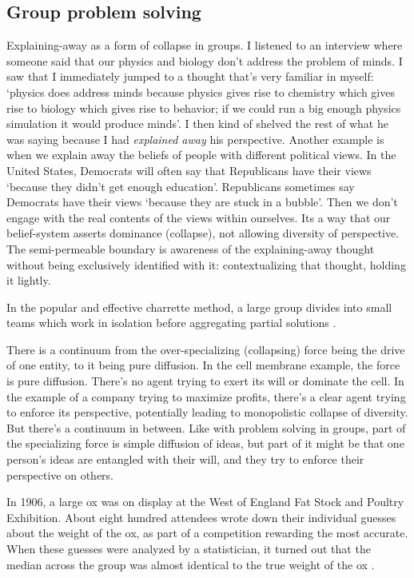 \subsection{Group problem solving}


Explaining-away as a form of collapse in groups. I listened to an interview where someone said that our physics and biology don't address the problem of minds. I saw that I immediately jumped to a thought that's very familiar in myself: `physics does address minds because physics gives rise to chemistry which gives rise to biology which gives rise to behavior; if we could run a big enough physics simulation it would produce minds'. I then kind of shelved the rest of what he was saying because I had \textit{explained away} his perspective. Another example is when we explain away the beliefs of people with different political views. In the United States, Democrats will often say that Republicans have their views `because they didn't get enough education'. Republicans sometimes say Democrats have their views `because they are stuck in a bubble'. Then we don't engage with the real contents of the views within ourselves. Its a way that our belief-system asserts dominance (collapse), not allowing diversity of perspective. The semi-permeable boundary is awareness of the explaining-away thought without being exclusively identified with it: contextualizing that thought, holding it lightly.


In the popular and effective charrette method, a large group divides into small teams which work in isolation before aggregating partial solutions \citep{lennertz2014charrette}. 

There is a continuum from the over-specializing (collapsing) force being the drive of one entity, to it being pure diffusion. In the cell membrane example, the force is pure diffusion. There's no agent trying to exert its will or dominate the cell. In the example of a company trying to maximize profits, there's a clear agent trying to enforce its perspective, potentially leading to monopolistic collapse of diversity. But there's a continuum in between. Like with problem solving in groups, part of the specializing force is simple diffusion of ideas, but part of it might be that one person's ideas are entangled with their will, and they try to enforce their perspective on others.


In 1906, a large ox was on display at the West of England Fat Stock and Poultry Exhibition. About eight hundred attendees wrote down their individual guesses about the weight of the ox, as part of a competition rewarding the most accurate. When these guesses were analyzed by a statistician, it turned out that the median across the group was almost identical to the true weight of the ox \citep{galton1907vox}. 

